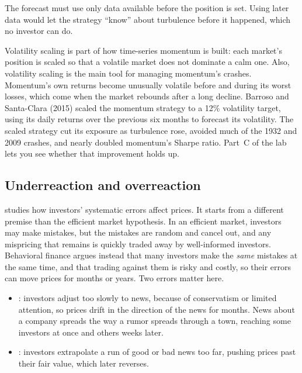 The forecast must use only data available before the position is set. Using later data would let the strategy ``know'' about turbulence before it happened, which no investor can do.

Volatility scaling is part of how time-series momentum is built: each market's position is scaled so that a volatile market does not dominate a calm one. 
Also, volatility scaling is the main tool for managing momentum's crashes. Momentum's own returns become unusually volatile before and during its worst losses, which come when the market rebounds after a long decline. Barroso and Santa-Clara (2015) scaled the momentum strategy to a 12\% volatility target, using its daily returns over the previous six months to forecast its volatility. The scaled strategy cut its exposure as turbulence rose, avoided much of the 1932 and 2009 crashes, and nearly doubled momentum's Sharpe ratio. Part~C of the lab lets you see whether that improvement holds up.

\subsection{Underreaction and overreaction}
\label{sec:05-behavior}

 studies how investors' systematic errors affect prices. It starts from a different premise than the efficient market hypothesis. In an efficient market, investors may make mistakes, but the mistakes are random and cancel out, and any mispricing that remains is quickly traded away by well-informed investors. Behavioral finance argues instead that many investors make the \emph{same} mistakes at the same time, and that trading against them is risky and costly, so their errors can move prices for months or years. Two errors matter here.

\begin{itemize}
  \item {}: investors adjust too slowly to news, because of conservatism or limited attention, so prices drift in the direction of the news for months. News about a company spreads the way a rumor spreads through a town, reaching some investors at once and others weeks later.
  \item {}: investors extrapolate a run of good or bad news too far, pushing prices past their fair value, which later reverses.
\end{itemize}

